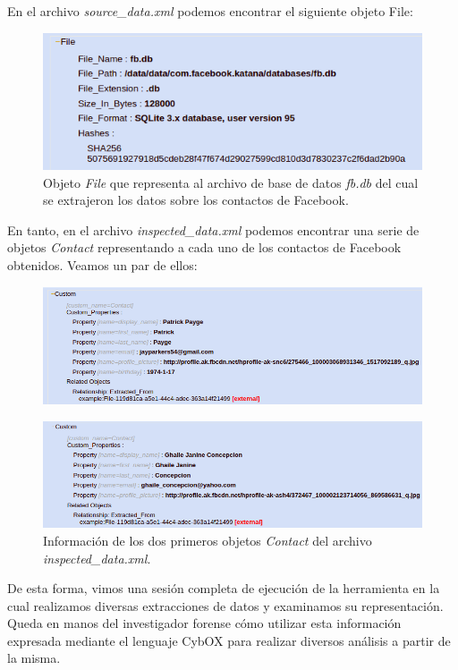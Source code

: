 En el archivo \emph{source\_data.xml} podemos encontrar el siguiente objeto File:
\newline

\begin{figure}[H]
    \begin{center}
        \includegraphics[width=\textwidth]{figures/FbDBFileObject}
        \caption{Objeto \emph{File} que representa al archivo de base de datos \emph{fb.db} del cual se extrajeron los datos sobre los contactos de Facebook.}
    \end{center}
\end{figure}

En tanto, en el archivo \emph{inspected\_data.xml} podemos encontrar una serie de objetos \emph{Contact} representando a cada uno de los contactos de Facebook obtenidos. Veamos un par de ellos:
\newline

\begin{figure}[H]
    \begin{center}
        \includegraphics[width=\textwidth]{figures/contact1}
    \end{center}
\end{figure}

\begin{figure}[H]
    \begin{center}
        \includegraphics[width=\textwidth]{figures/contact2}
        \caption{Información de los dos primeros objetos \emph{Contact} del archivo \emph{inspected\_data.xml}.}
    \end{center}
\end{figure}

De esta forma, vimos una sesión completa de ejecución de la herramienta en la cual realizamos diversas extracciones de datos y examinamos su representación. Queda en manos del investigador forense cómo utilizar esta información expresada mediante el lenguaje CybOX para realizar diversos análisis a partir de la misma.